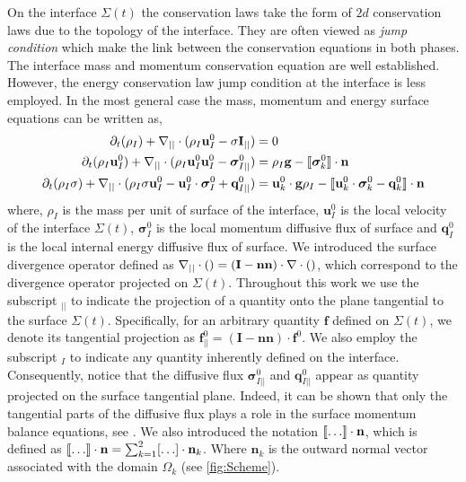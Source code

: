 On the interface $\Sigma(t)$ the conservation laws take the form of $2d$ conservation laws due to the topology of the interface. 
They are often viewed as \textit{jump condition} which make the link between the conservation equations in both phases. 
The interface mass and momentum conservation equation are well established.
However, the energy conservation law jump condition at the interface is less employed.
In the most general case the mass, momentum and energy surface equations can be written as, 
\begin{align}
    \label{eq:dt_rhoI}
    \partial_t (\rho_I)  
    + \mathbf{\nabla}_{||}\cdot (
    \rho_I\textbf{u}_I^0
    -\sigma \textbf{I}_{||} )
    &= 
    0
    \\
    \label{eq:dt_rhoIu_I}
    \partial_t (\rho_I\textbf{u}_I^0)  
    + \mathbf{\nabla}_{||}\cdot (
    \rho_I\textbf{u}_I^0\textbf{u}_I^0
    - \bm{\sigma}_{I||}^0)
    &= 
    \rho_I \textbf{g}
    - \llbracket 
        \bm\sigma^0_k
     \rrbracket \cdot \textbf{n}\\
    \label{eq:dt_rhoIE_I}
    \partial_t (\rho_I\sigma)  
    + \mathbf{\nabla}_{||}\cdot (
        \rho_I\sigma\textbf{u}_I^0
        - \textbf{u}_I^0 \cdot \bm{\sigma}_I^0 
        + \textbf{q}_{I||}^0
        )
    &= 
    \textbf{u}_k^0 \cdot \textbf{g}  \rho_I
    - \llbracket \textbf{u}_k^0 \cdot \bm{\sigma}_k^0 - \textbf{q}_k^0 \rrbracket \cdot \textbf{n}
\end{align} 
where, $\rho_I$ is the mass per unit of surface of the interface, $\textbf{u}_I^0$ is the local velocity of the interface $\Sigma(t)$, $\bm{\sigma}_I^0$ is the local momentum diffusive flux of surface and $\textbf{q}_I^0$ is the local internal energy diffusive flux of surface. 
We introduced the surface divergence operator defined as $\mathbf{\nabla}_{||}\cdot ()= (\textbf{I}-\textbf{nn})\cdot \mathbf{\nabla}\cdot ()$, which correspond to the divergence operator projected on $\Sigma(t)$. 
Throughout this work we use the subscript  $_{||}$ to indicate the projection of a quantity onto the plane tangential to the surface $\Sigma(t)$. 
Specifically, for an arbitrary quantity $\textbf{f}$ defined on $\Sigma(t)$, we denote its tangential projection as $\textbf{f}_{||}^0 = (\textbf{I}-\textbf{nn})\cdot \textbf{f}^0$. 
We also employ the subscript $_I$ to indicate any quantity inherently defined on the interface. 
Consequently, notice that the diffusive flux $\bm{\sigma}_{I||}^0$ and $\textbf{q}_{I||}^0$ appear as quantity projected on the surface tangential plane.
Indeed, it can be shown that only the tangential parts of the diffusive flux plays a role in the surface momentum balance equations, see \citet{slattery2007interfacial}.
We also introduced the notation $\llbracket \ldots \rrbracket \cdot \textbf{n}$, which is defined as $\llbracket \ldots \rrbracket \cdot \textbf{n} = \sum_{k=1}^2 [\ldots] \cdot \textbf{n}_k$.
Where $\textbf{n}_k$ is the outward normal vector associated with the domain $\Omega_k$ (see \ref{fig:Scheme}).

